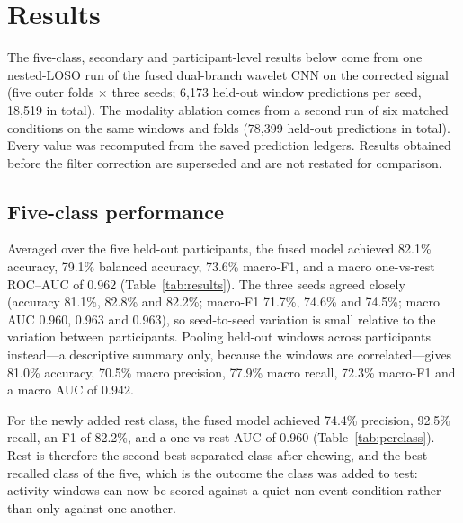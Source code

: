 \documentclass[pdflatex,sn-nature,iicol]{sn-jnl}
\begin{document}
\section{Results}

The five-class, secondary and participant-level results below come from one nested-LOSO run of the fused dual-branch wavelet CNN on the corrected signal (five outer folds $\times$ three seeds; 6,173 held-out window predictions per seed, 18,519 in total). The modality ablation comes from a second run of six matched conditions on the same windows and folds (78,399 held-out predictions in total). Every value was recomputed from the saved prediction ledgers. Results obtained before the filter correction are superseded and are not restated for comparison.

\subsection{Five-class performance}

Averaged over the five held-out participants, the fused model achieved 82.1\% accuracy, 79.1\% balanced accuracy, 73.6\% macro-F1, and a macro one-vs-rest ROC--AUC of 0.962 (Table~\ref{tab:results}). The three seeds agreed closely (accuracy 81.1\%, 82.8\% and 82.2\%; macro-F1 71.7\%, 74.6\% and 74.5\%; macro AUC 0.960, 0.963 and 0.963), so seed-to-seed variation is small relative to the variation between participants. Pooling held-out windows across participants instead---a descriptive summary only, because the windows are correlated---gives 81.0\% accuracy, 70.5\% macro precision, 77.9\% macro recall, 72.3\% macro-F1 and a macro AUC of 0.942.

For the newly added rest class, the fused model achieved 74.4\% precision, 92.5\% recall, an F1 of 82.2\%, and a one-vs-rest AUC of 0.960 (Table~\ref{tab:perclass}). Rest is therefore the second-best-separated class after chewing, and the best-recalled class of the five, which is the outcome the class was added to test: activity windows can now be scored against a quiet non-event condition rather than only against one another.
\end{document}
